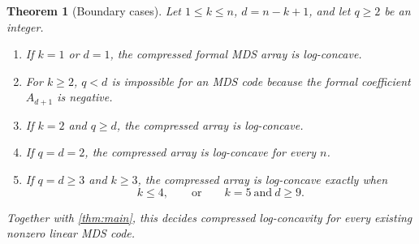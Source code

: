 \documentclass[11pt,letterpaper]{article}
\numberwithin{equation}{section}
\newtheorem{theorem}{Theorem}[section]
\theoremstyle{definition}
\begin{document}
\begin{theorem}[Boundary cases]\label{thm:boundary}
Let $1\le k\le n$, $d=n-k+1$, and let $q\ge2$ be an integer.
\begin{enumerate}[label=(\roman*)]
\item If $k=1$ or $d=1$, the compressed formal MDS array is
log-concave.
\item For $k\ge2$, $q<d$ is impossible for an MDS code because the
formal coefficient $A_{d+1}$ is negative.
\item If $k=2$ and $q\ge d$, the compressed array is log-concave.
\item If $q=d=2$, the compressed array is log-concave for every $n$.
\item If $q=d\ge3$ and $k\ge3$, the compressed array is log-concave
exactly when
\[
 k\le4,\qquad\text{or}\qquad k=5\ \text{and}\ d\ge9.
\]
\end{enumerate}
Together with \cref{thm:main}, this decides compressed log-concavity
for every existing nonzero linear MDS code.
\end{theorem}
\end{document}
